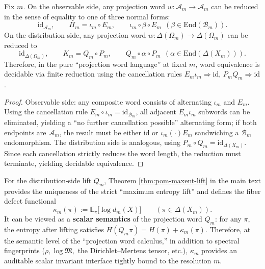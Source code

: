\begin{proposition}\label{prop:projection-word-normal-form}
Fix \(m\). On the observable side, any projection word \(w:\mathcal{A}_m\to\mathcal{A}_m\) can be reduced in the sense of equality to one of three normal forms:
\[
\mathrm{id}_{\mathcal{A}_m},\qquad
\Pi_m=\iota_m\circ E_m,\qquad
\iota_m\circ \beta\circ E_m\ \ (\beta\in\mathrm{End}(\mathcal{B}_m)).
\]
On the distribution side, any projection word \(w:\Delta(\Omega_m)\to\Delta(\Omega_m)\) can be reduced to
\[
\mathrm{id}_{\Delta(\Omega_m)},\qquad
K_m=Q_m\circ P_m,\qquad
Q_m\circ \alpha\circ P_m\ \ (\alpha\in\mathrm{End}(\Delta(X_m))).
\]
Therefore, in the pure ``projection word language'' at fixed \(m\), word equivalence is decidable via finite reduction using the cancellation rules \(E_m\iota_m\Rightarrow \mathrm{id}\), \(P_mQ_m\Rightarrow \mathrm{id}\).
\end{proposition}
\begin{proof}
Observable side: any composite word consists of alternating \(\iota_m\) and \(E_m\). Using the cancellation rule \(E_m\circ\iota_m=\mathrm{id}_{\mathcal{B}_m}\), all adjacent \(E_m\iota_m\) subwords can be eliminated, yielding a ``no further cancellation possible'' alternating form; if both endpoints are \(\mathcal{A}_m\), the result must be either \(\mathrm{id}\) or \(\iota_m(\cdot)E_m\) sandwiching a \(\mathcal{B}_m\) endomorphism.
The distribution side is analogous, using \(P_m\circ Q_m=\mathrm{id}_{\Delta(X_m)}\).
Since each cancellation strictly reduces the word length, the reduction must terminate, yielding decidable equivalence. \qedhere
\end{proof}

\begin{remark}\label{rem:projection-word-entropy-defect}
For the distribution-side lift \(Q_m\), Theorem \ref{thm:pom-maxent-lift} in the main text provides the uniqueness of the strict ``maximum entropy lift'' and defines the fiber defect functional
\[
\kappa_m(\pi):=\mathbb{E}_{\pi}\bigl[\log d_m(X)\bigr]\qquad(\pi\in\Delta(X_m)).
\]
It can be viewed as a \textbf{scalar semantics} of the projection word \(Q_m\): for any \(\pi\), the entropy after lifting satisfies
\(
H(Q_m\pi)=H(\pi)+\kappa_m(\pi)
\).
Therefore, at the semantic level of the ``projection word calculus,'' in addition to spectral fingerprints (\(\rho,\log\mathfrak{M},\) the Dirichlet--Mertens tensor, etc.), \(\kappa_m\) provides an auditable scalar invariant interface tightly bound to the resolution \(m\).
\end{remark}

